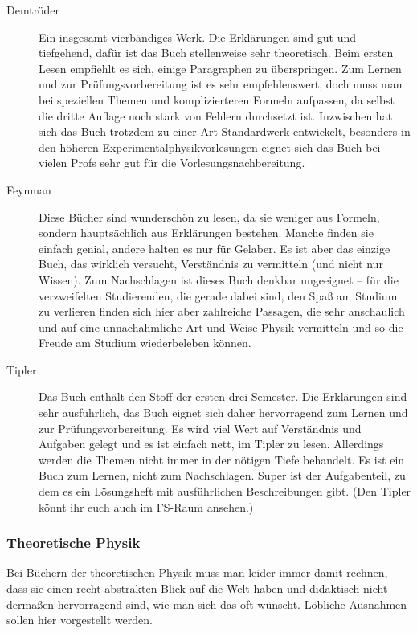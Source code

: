 \begin{description}
\item[Demtröder]{
		Ein insgesamt vierbändiges Werk. Die Erklärungen sind gut und tiefgehend, dafür ist das Buch stellenweise sehr theoretisch. Beim ersten Lesen empfiehlt es sich, einige Paragraphen zu überspringen. Zum Lernen und zur Prüfungsvorbereitung ist es sehr empfehlenswert, doch muss man bei speziellen Themen und komplizierteren Formeln aufpassen, da selbst die dritte Auflage noch stark von Fehlern durchsetzt ist. Inzwischen hat sich das Buch trotzdem zu einer Art Standardwerk entwickelt, besonders in den höheren Experimentalphysikvorlesungen eignet sich das Buch bei vielen Profs sehr gut für die Vorlesungsnachbereitung.}

\item[Feynman]{
		Diese Bücher sind wunderschön zu lesen, da sie weniger aus Formeln, sondern hauptsächlich aus Erklärungen bestehen. Manche finden sie einfach genial, andere halten es nur für Gelaber. Es ist aber das einzige Buch, das wirklich versucht, Verständnis zu vermitteln (und nicht nur Wissen). Zum Nachschlagen ist dieses Buch denkbar ungeeignet -- für die verzweifelten Studierenden, die gerade dabei sind, den Spaß am Studium zu verlieren finden sich hier aber zahlreiche Passagen, die sehr anschaulich und auf eine unnachahmliche Art und Weise Physik vermitteln und so die Freude am Studium wiederbeleben können.}

\item[Tipler]{
		Das Buch enthält den Stoff der ersten drei Semester. Die Erklärungen sind sehr ausführlich, das Buch eignet sich daher hervorragend zum Lernen und zur Prüfungsvorbereitung. Es wird viel Wert auf Verständnis und Aufgaben gelegt und es ist einfach nett, im Tipler zu lesen. Allerdings werden die Themen nicht immer in der nötigen Tiefe behandelt. Es ist ein Buch zum Lernen, nicht zum Nachschlagen. Super ist der Aufgabenteil, zu dem es ein Lösungsheft mit ausführlichen Beschreibungen gibt. (Den Tipler könnt ihr euch auch im FS-Raum ansehen.)}
\end{description}

\subsubsection{Theoretische Physik}

Bei Büchern der theoretischen Physik muss man leider immer damit rechnen, dass sie einen recht abstrakten Blick auf die Welt haben und didaktisch nicht dermaßen hervorragend sind, wie man sich das oft wünscht. Löbliche Ausnahmen sollen hier vorgestellt werden.

